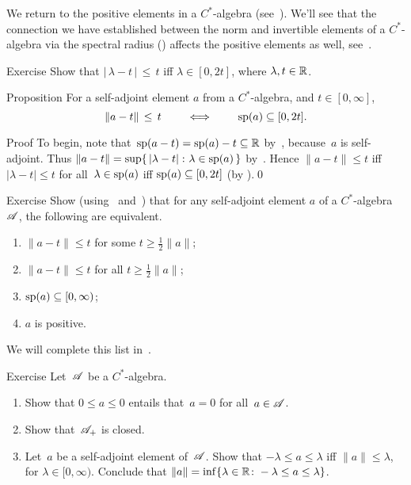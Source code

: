 \documentclass[a]{subfiles}
\begin{document}
\begin{parsec}%
\begin{point}%
We return to the positive elements 
in a $C^*$-algebra (see~).
We'll see that the connection we have established
between the norm and invertible elements
of a $C^*$-algebra
via the spectral radius ()
affects the positive elements as well, see~.
\end{point}
\begin{point}{Exercise}%
Show that 
$\left|\,\lambda-t\,\right| \,\leq\, t$ iff  $\lambda \in[0,2t]$,
where $\lambda,t\in\mathbb{R}$.
\end{point}
\begin{point}{Proposition}%
For a self-adjoint element $a$ from a $C^*$-algebra,
and $t\in [0,\infty]$, 
\begin{equation*}
\|a-t\|\,\leq\, t\qquad\iff\qquad \mathrm{sp}(a)\subseteq [0,2t].
\end{equation*}%
\begin{point}{Proof}%
To begin, note that~$\mathrm{sp}(a-t)=\mathrm{sp}(a)-t\subseteq \mathbb{R}$ 
by~,
because~$a$ is self-adjoint.
Thus $\|a-t\|=\sup\{\,\left|\lambda-t\right|\colon \lambda\in \mathrm{sp}(a)\,\}$
by~.
Hence $\|a-t\|\leq t$
iff $\left|\lambda-t\right|\leq t$ for all~$\lambda\in\mathrm{sp}(a)$
iff $\mathrm{sp}(a)\subseteq [0,2t]$ (by ).\qed
\end{point}
\begin{point}{Exercise}%
Show
(using~ and~)
that
for any self-adjoint element $a$ of a $C^*$-algebra~$\mathscr{A}$,
the following are equivalent.
\begin{enumerate}
\item 
\label{cstar-pos-1}
$\|a-t\|\leq t$
for some $t\geq \frac{1}{2}\|a\|$;
\item 
\label{cstar-pos-2}
$\|a-t\|\leq t$
for all $t\geq \frac{1}{2}\|a\|$;
\item 
\label{cstar-pos-3}
$\mathrm{sp}(a)\subseteq[0,\infty)$;
\item
$a$ is positive.
\end{enumerate}
We will complete this list in~.
\end{point}
\end{point}
\begin{point}{Exercise}%
Let~$\mathscr{A}$ be a $C^*$-algebra.
\begin{enumerate}
\item
Show that $0\leq a\leq 0$ entails that~$a=0$
for all~$a\in\mathscr{A}$.
\item
Show that~$\mathscr{A}_{+}$ is closed.
\item
Let~$a$ be a self-adjoint element of~$\mathscr{A}$.
Show that
 $-\lambda \leq a\leq \lambda$
iff $\|a\|\leq \lambda$,
for $\lambda\in [0,\infty)$.
Conclude that $\|a\| = \inf\{ \lambda \in \mathbb{R}\colon 
-\lambda \leq a\leq \lambda\}$.


\end{enumerate}
\end{point}
\end{parsec}
\end{document}

